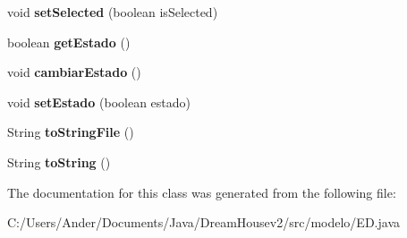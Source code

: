 \begin{DoxyCompactItemize}
void {\bfseries set\+Selected} (boolean is\+Selected)
\item 
\mbox{\label{classmodelo_1_1_e_d_aadb07ef1218bda2ede87c34610084c35}} 
boolean {\bfseries get\+Estado} ()
\item 
\mbox{\label{classmodelo_1_1_e_d_af6910c0fb0772f5467f2957737903342}} 
void {\bfseries cambiar\+Estado} ()
\item 
\mbox{\label{classmodelo_1_1_e_d_ad4534d695019f9baaf841ce40dc58338}} 
void {\bfseries set\+Estado} (boolean estado)
\item 
\mbox{\label{classmodelo_1_1_e_d_ad81faa7b79bdc75f0952cba078266b1e}} 
String {\bfseries to\+String\+File} ()
\item 
\mbox{\label{classmodelo_1_1_e_d_a299fd5ea8b36c66271e0cd99e5f7f7a1}} 
String {\bfseries to\+String} ()
\end{DoxyCompactItemize}


The documentation for this class was generated from the following file\+:\begin{DoxyCompactItemize}
\item 
C\+:/\+Users/\+Ander/\+Documents/\+Java/\+Dream\+Housev2/src/modelo/E\+D.\+java\end{DoxyCompactItemize}

